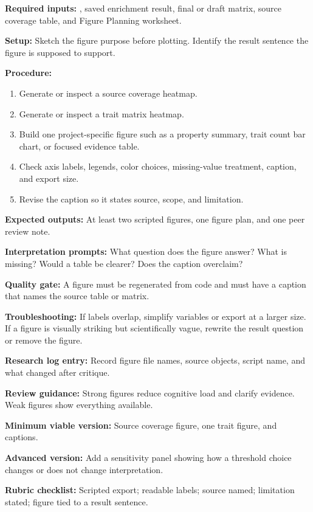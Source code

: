 \textbf{Required inputs:} , saved enrichment result, final or draft matrix, source coverage table, and Figure Planning worksheet.

\textbf{Setup:} Sketch the figure purpose before plotting. Identify the result sentence the figure is supposed to support.

\textbf{Procedure:}
\begin{enumerate}
  \item Generate or inspect a source coverage heatmap.
  \item Generate or inspect a trait matrix heatmap.
  \item Build one project-specific figure such as a property summary, trait count bar chart, or focused evidence table.
  \item Check axis labels, legends, color choices, missing-value treatment, caption, and export size.
  \item Revise the caption so it states source, scope, and limitation.
\end{enumerate}

\textbf{Expected outputs:} At least two scripted figures, one figure plan, and one peer review note.

\textbf{Interpretation prompts:} What question does the figure answer? What is missing? Would a table be clearer? Does the caption overclaim?

\textbf{Quality gate:} A figure must be regenerated from code and must have a caption that names the source table or matrix.

\textbf{Troubleshooting:} If labels overlap, simplify variables or export at a larger size. If a figure is visually striking but scientifically vague, rewrite the result question or remove the figure.

\textbf{Research log entry:} Record figure file names, source objects, script name, and what changed after critique.

\textbf{Review guidance:} Strong figures reduce cognitive load and clarify evidence. Weak figures show everything available.

\textbf{Minimum viable version:} Source coverage figure, one trait figure, and captions.

\textbf{Advanced version:} Add a sensitivity panel showing how a threshold choice changes or does not change interpretation.

\textbf{Rubric checklist:} Scripted export; readable labels; source named; limitation stated; figure tied to a result sentence.

